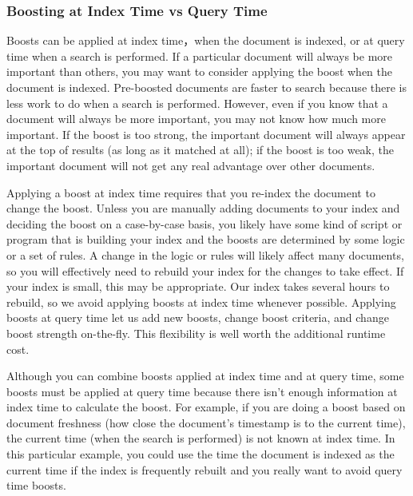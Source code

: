 \subsubsection{Boosting at Index Time vs Query Time}
\par Boosts can be applied at index time，when the document is indexed, or at query time when a search is performed. If a particular document will always be more important than others, you may want to consider applying the boost when the document is indexed. Pre-boosted documents are faster to search because there is less work to do when a search is performed. However, even if you know that a document will always be more important, you may not know how much more important. If the boost is too strong, the important document will always appear at the top of results (as long as it matched at all); if the boost is too weak, the important document will not get any real advantage over other documents.
\par Applying a boost at index time requires that you re-index the document to change the boost. Unless you are manually adding documents to your index and deciding the boost on a case-by-case basis, you likely have some kind of script or program that is building your index and the boosts are determined by some logic or a set of rules. A change in the logic or rules will likely affect many documents, so you will effectively need to rebuild your index for the changes to take effect. If your index is small, this may be appropriate. Our index takes several hours to rebuild, so we avoid applying boosts at index time whenever possible. Applying boosts at query time let us add new boosts, change boost criteria, and change boost strength on-the-fly. This flexibility is well worth the additional runtime cost.
\par Although you can combine boosts applied at index time and at query time, some boosts must be applied at query time because there isn’t enough information at index time to calculate the boost. For example, if you are doing a boost based on document freshness (how close the document’s timestamp is to the current time), the current time (when the search is performed) is not known at index time. In this particular example, you could use the time the document is indexed as the current time if the index is frequently rebuilt and you really want to avoid query time boosts.
